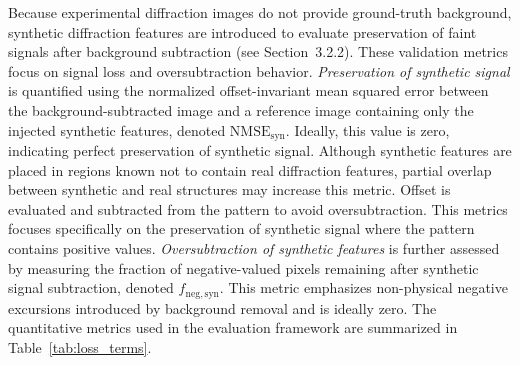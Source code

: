 \documentclass[iucr]{iucrjournals}
\begin{document}
Because experimental diffraction images do not provide ground-truth background, synthetic diffraction features are introduced to evaluate preservation of faint signals after background subtraction (see Section~3.2.2). These validation metrics focus on signal loss and oversubtraction behavior. \textit{Preservation of synthetic signal} is quantified using the normalized offset-invariant mean squared error between the background-subtracted image and a reference image containing only the injected synthetic features, denoted $\mathrm{NMSE}_{\mathrm{syn}}$. Ideally, this value is zero, indicating perfect preservation of synthetic signal. Although synthetic features are placed in regions known not to contain real diffraction features, partial overlap between synthetic and real structures may increase this metric. Offset is evaluated and subtracted from the pattern to avoid oversubtraction. This metrics focuses specifically on the preservation of synthetic signal where the pattern contains positive values. \textit{Oversubtraction of synthetic features} is further assessed by measuring the fraction of negative-valued pixels remaining after synthetic signal subtraction, denoted $f_{\mathrm{neg,syn}}$. This metric emphasizes non-physical negative excursions introduced by background removal and is ideally zero. The quantitative metrics used in the evaluation framework are summarized in Table~\ref{tab:loss_terms}.
\end{document}
